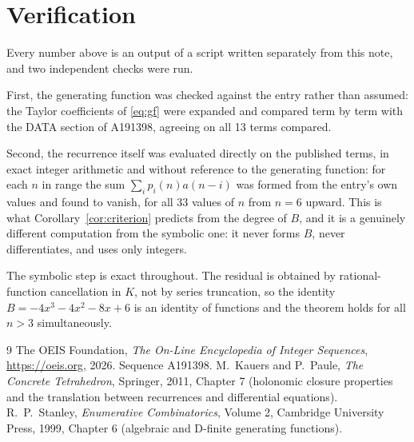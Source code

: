 \documentclass[11pt,a4paper]{article}
\theoremstyle{plain}
\theoremstyle{definition}
\begin{document}
\section{Verification}

Every number above is an output of a script written separately from this note, and two
independent checks were run.

First, the generating function was checked against the entry rather than assumed: the
Taylor coefficients of \eqref{eq:gf} were expanded and compared term by term with the DATA
section of A191398, agreeing on all 13 terms compared.

Second, the recurrence itself was evaluated directly on the published terms, in exact
integer arithmetic and without reference to the generating function: for each $n$ in range
the sum $\sum_{i}p_{i}(n)a(n-i)$ was formed from the entry's own values and found to
vanish, for all 33 values of $n$ from $n=6$ upward. This is what
Corollary~\ref{cor:criterion} predicts from the degree of $B$, and it is a genuinely
different computation from the symbolic one: it never forms $B$, never differentiates, and
uses only integers.

The symbolic step is exact throughout. The residual is obtained by rational-function
cancellation in $K$, not by series truncation, so the identity $B=- 4 x^{3} - 4 x^{2} - 8 x + 6$ is an
identity of functions and the theorem holds for all $n>3$ simultaneously.

\begin{thebibliography}{9}
 The OEIS Foundation, \emph{The On-Line Encyclopedia of Integer Sequences},
\url{https://oeis.org}, 2026. Sequence A191398.
 M.~Kauers and P.~Paule, \emph{The Concrete Tetrahedron}, Springer, 2011,
Chapter 7 (holonomic closure properties and the translation between recurrences and
differential equations).
 R.~P.~Stanley, \emph{Enumerative Combinatorics}, Volume 2, Cambridge
University Press, 1999, Chapter 6 (algebraic and D-finite generating functions).
\end{thebibliography}
\end{document}
